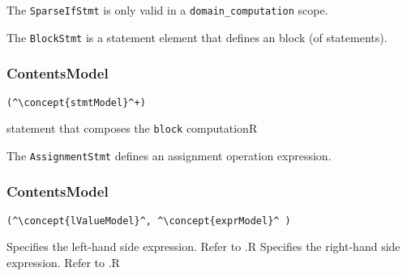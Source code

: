 The {\tt SparseIfStmt} is only valid in a {\tt domain\_computation} scope.

The {\tt BlockStmt} is a statement element that defines an block (of statements).

\subsubsection*{ContentsModel}{}

\begin{lstlisting}[style=default,frame=none]
(^\concept{stmtModel}^+)
\end{lstlisting}

\begin{HIRChildElements}
	{statement that composes the {\tt block} computation}{R}
\end{HIRChildElements}


The {\tt AssignmentStmt} defines an assignment operation expression.

\subsubsection*{ContentsModel}{}

\begin{lstlisting}[style=default,frame=none]
(^\concept{lValueModel}^, ^\concept{exprModel}^ )
\end{lstlisting}


\begin{HIRChildElements}
	{Specifies the left-hand side expression. 
	 Refer to .}{R}
	{Specifies the right-hand side expression. 
	 Refer to .}{R}
\end{HIRChildElements}

